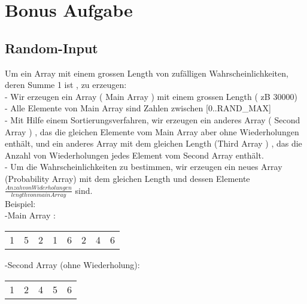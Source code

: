 \documentclass[11pt]{article}
\begin{document}
{{{\section{Bonus Aufgabe}
\subsection{Random-Input}
\begin{large}

Um ein Array mit einem grossen Length von zuf\"alligen Wahrscheinlichkeiten, deren Summe 1 ist , zu erzeugen:\\
-	Wir erzeugen ein Array ( Main Array ) mit einem grossen Length ( zB 30000)  \\
-	Alle Elemente von Main Array sind Zahlen zwischen [0..RAND\_MAX] \\
-	Mit Hilfe einem Sortierungsverfahren, wir erzeugen ein anderes Array ( Second Array ) , das die gleichen Elemente vom Main Array aber ohne Wiederholungen enth\"alt, und ein anderes Array mit dem gleichen Length (Third Array ) , das die Anzahl von Wiederholungen jedes Element vom Second Array enth\"alt.\\
-	Um die Wahrscheinlichkeiten zu bestimmen, wir erzeugen ein neues Array (Probability Array) mit dem gleichen Length und dessen Elemente $\frac{Anzah von Widerholungen}{length von main Array}$ sind.\\
{\color{red}Beispiel:} \\

{\large -Main Array :} \\
\begin{Large}


\begin{tabular}{l|l|l|l|l|l|l|l}
\hline 
1 & 5 & 2 & 1 & 6 & 2 & 4 & 6 \\

\end{tabular}
\end{Large}

{\large -Second Array (ohne Wiederholung): }\\
\begin{Large}


\begin{tabular}{l|l|l|l|l}
\hline 
1 & 2 & 4 & 5 & 6\\

\end{tabular}
\end{Large}


\end{large}}}}
\end{document}
